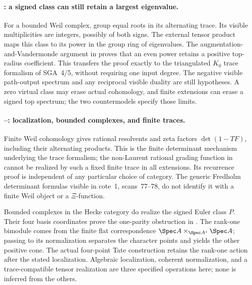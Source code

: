 \paragraph{: a signed class can still retain a largest eigenvalue.}
For a bounded Weil complex, group equal roots in its alternating trace.
Its visible multiplicities are integers, possibly of both signs.
The external tensor product maps this class to its power in the
group ring of eigenvalues. The augmentation-and-Vandermonde argument
in  proves that an even power retains a positive top-radius
coefficient. This transfers the proof exactly to the triangulated
$K_0$ trace formalism of SGA~4/5, without requiring one input degree.
The negative visible path-output spectrum and any reciprocal visible
duality are still hypotheses. A zero virtual class may erase actual
cohomology, and finite extensions can erase a signed top spectrum;
the two countermodels specify those limits.

\paragraph{--: localization, bounded complexes, and finite traces.}
Finite Weil cohomology gives rational resolvents and zeta factors
$\det(1-TF)$, including their alternating products. This is the
finite determinant mechanism underlying the trace formalism; the
non-Laurent rational grading function in  cannot be realized
by such a fixed finite trace in all extensions. Its recurrence proof
is independent of any particular choice of category. The generic
Fredholm determinant formulas visible in cote~1, scans~77--78,
do not identify it with a finite Weil object or a $\Xi$-function.

Bounded complexes in the Hecke category do realize the signed Euler
class $P$. Their four basis coordinates prove the one-parity
obstruction in . The rank-one bimodule comes from the
finite flat correspondence
$\Spec A\times_{\Spec A^s}\Spec A$; passing to its normalization
separates the character points and yields the other positive cone.
The actual four-point Tate construction retains the rank-one action
after the stated localization. Algebraic localization, coherent
normalization, and a trace-compatible tensor realization are three
specified operations here; none is inferred from the others.

